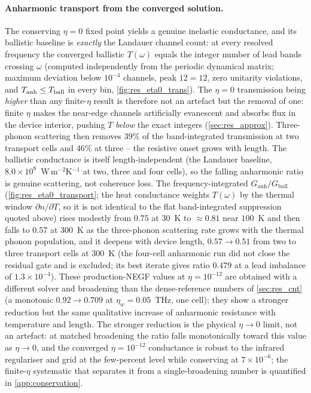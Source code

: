 \paragraph{Anharmonic transport from the converged solution.} The conserving
$\eta=0$ fixed point yields a genuine inelastic conductance, and its ballistic
baseline is \emph{exactly} the Landauer channel count: at every resolved
frequency the converged ballistic $T(\omega)$ equals the integer number of lead
bands crossing $\omega$ (computed independently from the periodic dynamical
matrix; maximum deviation below $10^{-4}$ channels, peak $12=12$, zero
unitarity violations, and $T_{\rm anh}\le T_{\rm ball}$ in every bin,
\cref{fig:res_eta0_trans}). The $\eta=0$ transmission being \emph{higher} than
any finite-$\eta$ result is therefore not an artefact but the removal of one:
finite $\eta$ makes the near-edge channels artificially evanescent and absorbs
flux in the device interior, pushing $T$ \emph{below} the exact integers
(\cref{sec:res_approx}). Three-phonon scattering then removes $39\%$ of the
band-integrated transmission at two transport cells and $46\%$ at three -- the
resistive onset grows with length. The ballistic conductance is itself length-independent (the Landauer
baseline, $8.0\times10^{8}$~W\,m$^{-2}$K$^{-1}$ at two, three and four cells), so
the falling anharmonic ratio is genuine scattering, not coherence loss. The
frequency-integrated $G_\mathrm{anh}/G_\mathrm{ball}$ (\cref{fig:res_eta0_transport};
the heat conductance weights $T(\omega)$ by the thermal window $\partial n/\partial T$,
so it is not identical to the flat band-integrated suppression quoted above)
rises modestly from $0.75$ at $30$~K to $\approx 0.81$ near $100$~K and then falls
to $0.57$ at $300$~K as the three-phonon scattering rate grows with the thermal
phonon population, and it deepens with device length, $0.57\to0.51$ from two to
three transport cells at $300$~K (the four-cell anharmonic run did not close
the residual gate and is excluded; its best iterate gives ratio $0.479$ at a
lead imbalance of $1.3\times10^{-4}$). These production-NEGF values at
$\eta=10^{-12}$ are obtained with a different solver and broadening than the
dense-reference numbers of \cref{sec:res_cnt} (a monotonic $0.92\to0.709$ at
$\eta_w=0.05$~THz, one cell); they show a stronger reduction
but the same qualitative increase of anharmonic resistance with temperature and
length. The stronger reduction is the physical $\eta\to0$ limit, not an
artefact: at matched broadening the ratio falls monotonically toward this value
as $\eta\to0$, and the converged $\eta=10^{-12}$ conductance is robust to the
infrared regulariser and grid at the few-percent level while conserving at
$7\times10^{-6}$; the finite-$\eta$ systematic that separates it from a
single-broadening number is quantified in \cref{app:conservation}.

